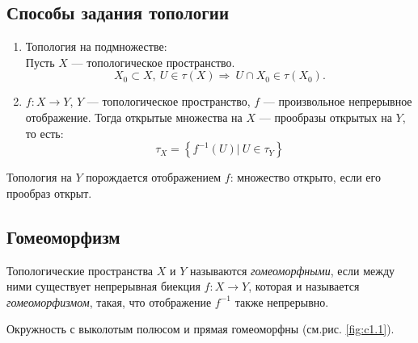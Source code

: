 \subsection{Способы задания топологии}
\begin{enumerate}
    \item Топология на подмножестве: \\
    Пусть $X$ — топологическое пространство. $$X_0 \subset X, \ U \in \tau(X) \Longrightarrow \ U \cap X_0 \in \tau(X_0).$$
    \item $f: X \to Y$, $Y$ — топологическое пространство, $f$ — произвольное непрерывное отображение. Тогда открытые множества на $X$ — прообразы открытых на $Y$, то есть:
    \[\tau_X = \left\{f^{-1}(U) | \ U \in \tau_Y\right\}\]
\end{enumerate}

\begin{remark}
    Топология на $Y$ порождается отображением $f$: множество открыто, если его прообраз открыт.
\end{remark}

\subsection{Гомеоморфизм}
\begin{definition}
    Топологические пространства $X$ и $Y$ называются \textit{гомеоморфными}, если между ними существует непрерывная биекция $f: X \to Y$, которая и называется \textit{гомеоморфизмом}, такая, что отображение $f^{-1}$ также непрерывно.
\end{definition}


\begin{example}
    Окружность с выколотым полюсом и прямая гомеоморфны (см.рис. \ref{fig:c1.1}).
\end{example}

